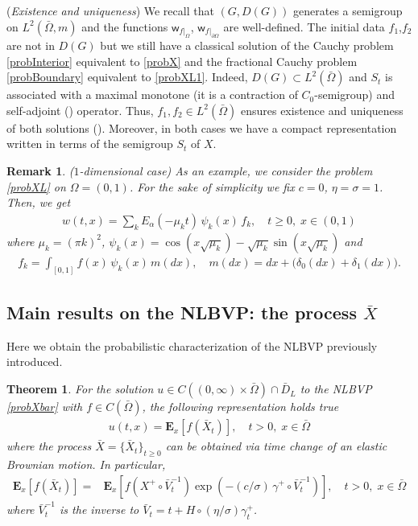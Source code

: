\documentclass[11pt,a4paper]{article}
\newtheorem{theorem}{Theorem}[section]
\newtheorem{remark}{Remark}[section]
\begin{document}
\vspace{.5cm}


({\it Existence and uniqueness}) We recall that $(G,D(G))$ generates a semigroup on $L^2(\bar{\Omega}, m)$ and the functions $\mathsf{w}_{f|_{\Omega}}$, $\mathsf{w}_{f|_{\partial \Omega}}$ are well-defined. The initial data $f_1$,$f_2$ are not in $D(G)$ but we still have a classical solution of the Cauchy problem \eqref{probInterior} equivalent to \eqref{probX} and the fractional Cauchy problem \eqref{probBoundary} equivalent to \eqref{probXL1}. Indeed, $D(G)\subset L^2(\bar{\Omega})$ and $S_t$ is associated with a maximal monotone (it is a contraction of $C_0$-semigroup) and self-adjoint (\cite{GrVo17}) operator. Thus, $f_1,f_2 \in L^2(\bar{\Omega})$ ensures existence and uniqueness of both solutions (\cite[Theorem VII.7]{Brezis}). Moreover, in both cases we have a compact representation written in terms of the semigroup $S_t$ of $X$.


\begin{remark}
($1$-dimensional case) As an example, we consider the problem \eqref{probXL} on $\Omega=(0,1)$. For the sake of simplicity we fix $c=0$, $\eta=\sigma=1$. Then, we get
\begin{align*}
w(t,x) = \sum_{k} E_\alpha(-\mu_k t) \, \psi_k(x) \, f_k, \quad t\geq 0, \; x \in (0,1)
\end{align*}
where $\mu_k = (\pi k)^2$, $\psi_k(x) = \cos(x \sqrt{\mu_k}) - \sqrt{\mu_k} \sin (x \sqrt{\mu_k})$ and
\begin{align*}
f_k = \int_{[0,1]} f(x)\, \psi_k(x)\, m(dx), \quad m(dx) = dx + \big(\delta_0(dx) + \delta_1(dx)\big).
\end{align*}
\end{remark}



\subsection{Main results on the NLBVP: the process $\bar{X}$}
\label{Sec:MainXbar}

Here we obtain the probabilistic characterization of the NLBVP previously introduced.

\begin{theorem}
\label{thm:MAINI}
For the solution $u \in C((0, \infty)\times \bar{\Omega}) \cap \bar{D}_L$ to the NLBVP \eqref{probXbar} with $f \in C(\bar{\Omega})$, the following representation holds true
\begin{align*}
u(t,x) = \mathbf{E}_x\left[ f(\bar{X}_t) \right], \quad t>0,\; x \in \bar{\Omega}
\end{align*}
where the process $\bar{X} = \{\bar{X}_t\}_{t\geq 0}$ can be obtained via time change of an elastic Brownian motion. In particular, 
\begin{align}
\label{MINrepXbar}
\mathbf{E}_x\left[ f(\bar{X}_t) \right] = & \mathbf{E}_x\left[f(X^+ \circ \bar{V}^{-1}_t) \exp \left( - (c/\sigma)\, \gamma^+ \circ \bar{V}^{-1}_t \right) \right], \quad t>0,\; x \in \bar{\Omega}
\end{align}
where $\bar{V}^{-1}_t$ is the inverse to $\bar{V}_t = t + H \circ (\eta/\sigma) \gamma^+_t$.
\end{theorem}
\end{document}
